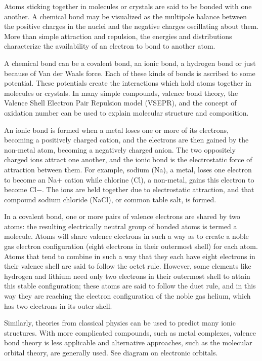 \documentclass[
]{book}
\begin{document}
Atoms sticking together in molecules or crystals are said to be bonded with one another. A chemical bond may be visualized as the multipole balance between the positive charges in the nuclei and the negative charges oscillating about them. More than simple attraction and repulsion, the energies and distributions characterize the availability of an electron to bond to another atom.

A chemical bond can be a covalent bond, an ionic bond, a hydrogen bond or just because of Van der Waals force. Each of these kinds of bonds is ascribed to some potential. These potentials create the interactions which hold atoms together in molecules or crystals. In many simple compounds, valence bond theory, the Valence Shell Electron Pair Repulsion model (VSEPR), and the concept of oxidation number can be used to explain molecular structure and composition.

An ionic bond is formed when a metal loses one or more of its electrons, becoming a positively charged cation, and the electrons are then gained by the non-metal atom, becoming a negatively charged anion. The two oppositely charged ions attract one another, and the ionic bond is the electrostatic force of attraction between them. For example, sodium (Na), a metal, loses one electron to become an Na+ cation while chlorine (Cl), a non-metal, gains this electron to become Cl−. The ions are held together due to electrostatic attraction, and that compound sodium chloride (NaCl), or common table salt, is formed.

In a covalent bond, one or more pairs of valence electrons are shared by two atoms: the resulting electrically neutral group of bonded atoms is termed a molecule. Atoms will share valence electrons in such a way as to create a noble gas electron configuration (eight electrons in their outermost shell) for each atom. Atoms that tend to combine in such a way that they each have eight electrons in their valence shell are said to follow the octet rule. However, some elements like hydrogen and lithium need only two electrons in their outermost shell to attain this stable configuration; these atoms are said to follow the duet rule, and in this way they are reaching the electron configuration of the noble gas helium, which has two electrons in its outer shell.

Similarly, theories from classical physics can be used to predict many ionic structures. With more complicated compounds, such as metal complexes, valence bond theory is less applicable and alternative approaches, such as the molecular orbital theory, are generally used. See diagram on electronic orbitals.
\end{document}
